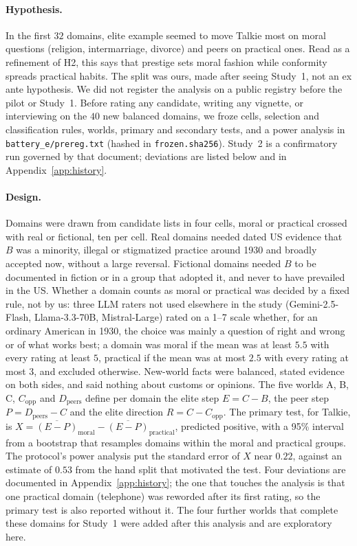 \documentclass[11pt]{article}
\begin{document}
\paragraph{Hypothesis.}
In the first $32$ domains, elite example seemed to move Talkie most on moral questions (religion, intermarriage, divorce) and peers on practical ones.
Read as a refinement of H2, this says that prestige sets moral fashion while conformity spreads practical habits.
The split was ours, made after seeing Study~1, not an ex ante hypothesis.
We did not register the analysis on a public registry before the pilot or Study~1.
Before rating any candidate, writing any vignette, or interviewing on the $40$ new balanced domains, we froze cells, selection and classification rules, worlds, primary and secondary tests, and a power analysis in \texttt{battery\_e/prereg.txt} (hashed in \texttt{frozen.sha256}).
Study~2 is a confirmatory run governed by that document; deviations are listed below and in Appendix~\ref{app:history}.

\paragraph{Design.}
Domains were drawn from candidate lists in four cells, moral or practical crossed with real or fictional, ten per cell.
Real domains needed dated US evidence that $B$ was a minority, illegal or stigmatized practice around 1930 and broadly accepted now, without a large reversal.
Fictional domains needed $B$ to be documented in fiction or in a group that adopted it, and never to have prevailed in the US.
Whether a domain counts as moral or practical was decided by a fixed rule, not by us: three LLM raters not used elsewhere in the study (Gemini-2.5-Flash, Llama-3.3-70B, Mistral-Large) rated on a 1--7 scale whether, for an ordinary American in 1930, the choice was mainly a question of right and wrong or of what works best; a domain was moral if the mean was at least $5.5$ with every rating at least $5$, practical if the mean was at most $2.5$ with every rating at most $3$, and excluded otherwise.
New-world facts were balanced, stated evidence on both sides, and said nothing about customs or opinions.
The five worlds A, B, C, $C_{\text{opp}}$ and $D_{\text{peers}}$ define per domain the elite step $E=C-B$, the peer step $P=D_{\text{peers}}-C$ and the elite direction $R=C-C_{\text{opp}}$.
The primary test, for Talkie, is $X=\overline{(E-P)}_{\text{moral}}-\overline{(E-P)}_{\text{practical}}$, predicted positive, with a 95\% interval from a bootstrap that resamples domains within the moral and practical groups.
The protocol's power analysis put the standard error of $X$ near $0.22$, against an estimate of $0.53$ from the hand split that motivated the test.
Four deviations are documented in Appendix~\ref{app:history}; the one that touches the analysis is that one practical domain (telephone) was reworded after its first rating, so the primary test is also reported without it.
The four further worlds that complete these domains for Study~1 were added after this analysis and are exploratory here.
\end{document}
